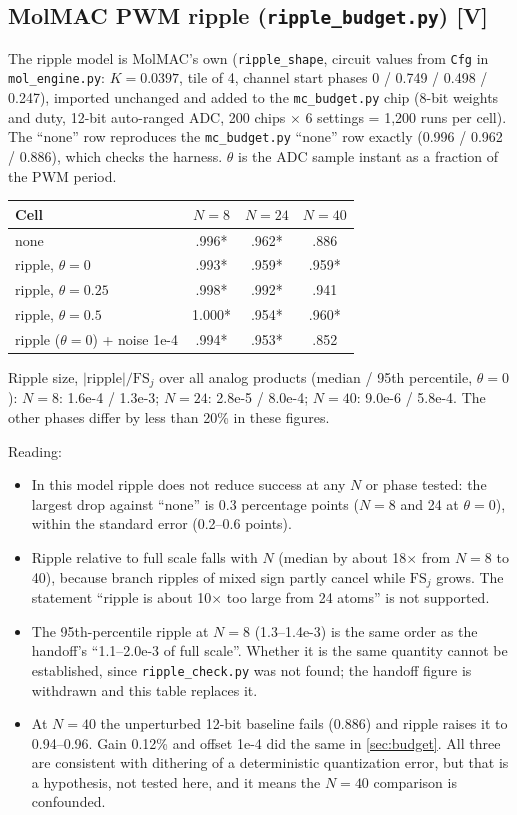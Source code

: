 \documentclass[11pt]{article}
\newcommand{\x}{$\times$}
\newcommand{\scr}[1]{\texttt{#1}}
\begin{document}
\subsection{MolMAC PWM ripple (\scr{ripple\_budget.py}) [V]}

The ripple model is MolMAC's own (\scr{ripple\_shape}, circuit values from \scr{Cfg} in \scr{mol\_engine.py}: $K = 0.0397$, tile of 4, channel start phases 0 / 0.749 / 0.498 / 0.247), imported unchanged and added to the \scr{mc\_budget.py} chip (8-bit weights and duty, 12-bit auto-ranged ADC, 200 chips \x{} 6 settings = 1,200 runs per cell). The ``none'' row reproduces the \scr{mc\_budget.py} ``none'' row exactly (0.996 / 0.962 / 0.886), which checks the harness. $\theta$ is the ADC sample instant as a fraction of the PWM period.

\begin{center}
\begin{tabular}{lccc}
\toprule
Cell & $N = 8$ & $N = 24$ & $N = 40$ \\
\midrule
none & .996* & .962* & .886 \\
ripple, $\theta = 0$ & .993* & .959* & .959* \\
ripple, $\theta = 0.25$ & .998* & .992* & .941 \\
ripple, $\theta = 0.5$ & 1.000* & .954* & .960* \\
ripple ($\theta = 0$) + noise 1e-4 & .994* & .953* & .852 \\
\bottomrule
\end{tabular}
\end{center}

Ripple size, $|\text{ripple}| / \mathrm{FS}_j$ over all analog products (median / 95th percentile, $\theta = 0$): $N = 8$: 1.6e-4 / 1.3e-3; $N = 24$: 2.8e-5 / 8.0e-4; $N = 40$: 9.0e-6 / 5.8e-4. The other phases differ by less than 20\% in these figures.

Reading:
\begin{itemize}
  \item In this model ripple does not reduce success at any $N$ or phase tested: the largest drop against ``none'' is 0.3 percentage points ($N = 8$ and 24 at $\theta = 0$), within the standard error (0.2--0.6 points).
  \item Ripple relative to full scale falls with $N$ (median by about 18\x{} from $N = 8$ to 40), because branch ripples of mixed sign partly cancel while $\mathrm{FS}_j$ grows. The statement ``ripple is about 10\x{} too large from 24 atoms'' is not supported.
  \item The 95th-percentile ripple at $N = 8$ (1.3--1.4e-3) is the same order as the handoff's ``1.1--2.0e-3 of full scale''. Whether it is the same quantity cannot be established, since \scr{ripple\_check.py} was not found; the handoff figure is withdrawn and this table replaces it.
  \item At $N = 40$ the unperturbed 12-bit baseline fails (0.886) and ripple raises it to 0.94--0.96. Gain 0.12\% and offset 1e-4 did the same in \ref{sec:budget}. All three are consistent with dithering of a deterministic quantization error, but that is a hypothesis, not tested here, and it means the $N = 40$ comparison is confounded.
\end{itemize}
\end{document}
